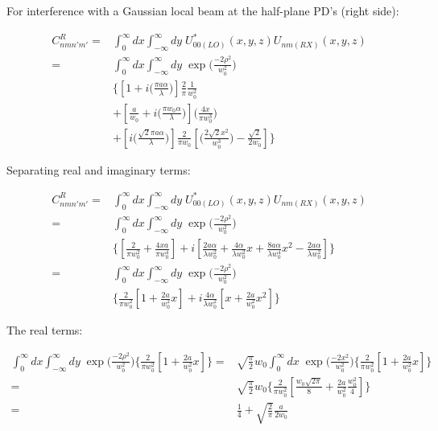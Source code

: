 \documentclass[aps,twoside,secnumarabic,balancelastpage,amsmath,amssymb,nofootinbib,hyperref=pdftex]{revtex4}
\newcommand{\bigfrac}[2]{\Big( \frac{#1}{#2}\Big)}
\begin{document}
For interference with a Gaussian local beam at the half-plane PD's (right side):

\begin{align*}
C_{nmn'm'}^{R} =& \int_{0}^{\infty} dx\int_{-\infty}^{\infty} dy \; U_{00(LO)}^*(x,y,z) U_{nm(RX)}(x,y,z)
\\=&
	\int_{0}^{\infty}dx\int_{-\infty}^{\infty}  dy \;
			\exp \bigfrac{-2\rho^2}{w_{0}^{2}} 
		\\&
					\lbrace\left[
				1+
				i \bigfrac{ \pi a \alpha}{ \lambda}
			\right]
		\frac{2}{\pi}
		\frac{1}{w_{0}^2}
\\&	+
	\left[
			\frac{a}{w_{0}}		
			+
			i  \bigfrac{\pi w_{0} \alpha}{\lambda}	
	\right]
		\Big( \frac{4 x}{\pi w_{0}^3} \Big)		 
\\& +
	\left[
		i \bigfrac{\sqrt{2} \pi a \alpha}{ \lambda}
	\right]
						\frac{2}{\pi w_0}
\left[ \bigfrac{2 \sqrt{2}x^{2}}{w_{0}^{3}}- \frac{\sqrt{2}}{2 w_0 } \right]	
\rbrace
\end{align*}

Separating real and imaginary terms:

\begin{align*}
C_{nmn'm'}^{R} =& \int_{0}^{\infty} dx\int_{-\infty}^{\infty} dy \; U_{00(LO)}^*(x,y,z) U_{nm(RX)}(x,y,z)
\\=&
	\int_{0}^{\infty}dx\int_{-\infty}^{\infty}  dy \;
			\exp \bigfrac{-2\rho^2}{w_{0}^{2}} 
		\\&
		\lbrace
			\left[
				\frac{2}{\pi w_0^2}
				+
				\frac{4xa}{\pi w_0^4}
			\right]
			+
			i
			\left[
				\frac{2 a \alpha}{\lambda w_0^2}
				+
				\frac{4  \alpha}{ \lambda w_0^2} x
				+
				\frac{8 a \alpha}{\lambda w_0^4} x^2
				-
				\frac{2 a \alpha}{\lambda w_0^2}				
			\right]	
		\rbrace
\\=&
	\int_{0}^{\infty}dx\int_{-\infty}^{\infty}  dy \;
			\exp \bigfrac{-2\rho^2}{w_{0}^{2}} 
		\\&
		\lbrace
			\frac{2}{\pi w_0^2}
			\left[
				1
				+
				\frac{2a}{w_0^2} x
			\right]
			+
			i
			\frac{4 \alpha }{\lambda w_0^2}
			\left[
				x
				+
				\frac{2 a }{ w_0^2} x^2			
			\right]	
		\rbrace
\end{align*}

The real terms:

\begin{align*}
\int_{0}^{\infty}dx\int_{-\infty}^{\infty}  dy \;
			\exp \bigfrac{-2\rho^2}{w_{0}^{2}} 
		\lbrace
			\frac{2}{\pi w_0^2}
			\left[
				1
				+
				\frac{2a}{w_0^2} x
			\right]
		\rbrace
	=&
	\sqrt{\frac{\pi}{2}} w_0
	\int_{0}^{\infty}dx  \;
			\exp \bigfrac{-2 x^2}{w_{0}^{2}} 
		\lbrace
			\frac{2}{\pi w_0^2}
			\left[
				1
				+
				\frac{2a}{w_0^2} x
			\right]
		\rbrace
		\\=&
		\sqrt{\frac{\pi}{2}} w_0
		\lbrace
			\frac{2}{\pi w_0^2}
			\left[
				\frac{ w_0 \sqrt{2 \pi}}{8}
				+
				\frac{2a}{w_0^2} \frac{w_0^2}{4}
			\right]
		\rbrace		
		\\=&
				\frac{1}{4}
				+
				\sqrt{\frac{2}{\pi}}\frac{a}{2 w_0}	
\end{align*}	
\end{document}
